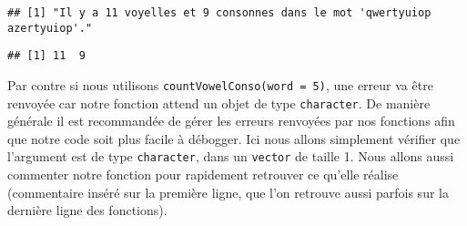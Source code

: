 \documentclass[]{book}
\newenvironment{Shaded}{\begin{snugshade}}{\end{snugshade}}
\newcommand{\KeywordTok}[1]{\textcolor[rgb]{0.13,0.29,0.53}{\textbf{#1}}}
\newcommand{\DataTypeTok}[1]{\textcolor[rgb]{0.13,0.29,0.53}{#1}}
\newcommand{\DecValTok}[1]{\textcolor[rgb]{0.00,0.00,0.81}{#1}}
\newcommand{\StringTok}[1]{\textcolor[rgb]{0.31,0.60,0.02}{#1}}
\newcommand{\ControlFlowTok}[1]{\textcolor[rgb]{0.13,0.29,0.53}{\textbf{#1}}}
\newcommand{\OperatorTok}[1]{\textcolor[rgb]{0.81,0.36,0.00}{\textbf{#1}}}
\newcommand{\NormalTok}[1]{#1}
\theoremstyle{definition}
\theoremstyle{definition}
\theoremstyle{definition}
\theoremstyle{remark}
\begin{document}
\begin{Shaded}
\end{Shaded}

\begin{verbatim}
## [1] "Il y a 11 voyelles et 9 consonnes dans le mot 'qwertyuiop azertyuiop'."
\end{verbatim}

\begin{verbatim}
## [1] 11  9
\end{verbatim}

Par contre si nous utilisons \texttt{countVowelConso(word\ =\ 5)}, une
erreur va être renvoyée car notre fonction attend un objet de type
\texttt{character}. De manière générale il est recommandée de gérer les
erreurs renvoyées par nos fonctions afin que notre code soit plus facile
à débogger. Ici nous allons simplement vérifier que l'argument est de
type \texttt{character}, dans un \texttt{vector} de taille 1. Nous
allons aussi commenter notre fonction pour rapidement retrouver ce
qu'elle réalise (commentaire inséré sur la première ligne, que l'on
retrouve aussi parfois sur la dernière ligne des fonctions).
\end{document}

